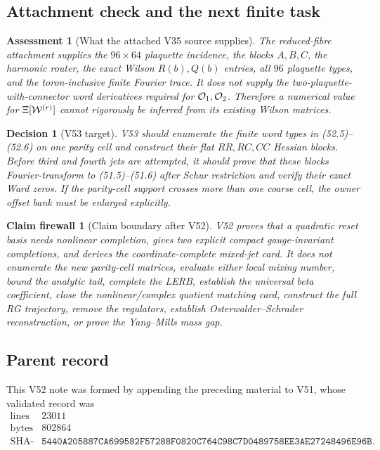 \documentclass[11pt,oneside]{book}
\newtheorem{assessment}[theorem]{Assessment}
\newtheorem{firewall}[theorem]{Claim firewall}
\newtheorem{decision}[theorem]{Decision}
\theoremstyle{definition}
\theoremstyle{remark}
\begin{document}
\subsection{Attachment check and the next finite task}

\begin{assessment}[What the attached V35 source supplies]
\label{ass:e8v52-attachment-check}
The reduced-fibre attachment supplies the \(96\times64\) plaquette
incidence, the blocks \(A,B,C\), the harmonic router, the exact
Wilson \(R(b),Q(b)\) entries, all \(96\) plaquette types, and the
toron-inclusive finite Fourier trace.  It does not supply the
two-plaquette-with-connector word derivatives required for
\({\cal O}_1,{\cal O}_2\).  Therefore a numerical value for
\(\Xi[{\cal W}^{(r)}]\) cannot rigorously be inferred from its
existing Wilson matrices.
\end{assessment}

\begin{decision}[V53 target]
\label{dec:e8v52-next}
V53 should enumerate the finite word types in (52.5)--(52.6) on
one parity cell and construct their flat \(RR,RC,CC\) Hessian
blocks.  Before third and fourth jets are attempted, it should
prove that these blocks Fourier-transform to (51.5)--(51.6) after
Schur restriction and verify their exact Ward zeros.  If the
parity-cell support crosses more than one coarse cell, the owner
offset bank must be enlarged explicitly.
\end{decision}

\begin{firewall}[Claim boundary after V52]
\label{fire:e8v52-claim}
V52 proves that a quadratic reset basis needs nonlinear
completion, gives two explicit compact gauge-invariant
completions, and derives the coordinate-complete mixed-jet card.
It does not enumerate the new parity-cell matrices, evaluate either
local mixing number, bound the analytic tail, complete the LERB,
establish the universal beta coefficient, close the
nonlinear/complex quotient matching card, construct the full RG
trajectory, remove the regulators, establish
Osterwalder--Schrader reconstruction, or prove the Yang--Mills mass
gap.
\end{firewall}

\subsection{Parent record}

This V52 note was formed by appending the preceding material to V51,
whose validated record was
\[
\begin{array}{c|c}
\text{lines}&23011\\
\text{bytes}&802864\\
\text{SHA-256}&
\texttt{5440A205887CA699582F57288F0820C764C98C7D0489758EE3AE27248496E96B}.
\end{array}
\]
\end{document}
